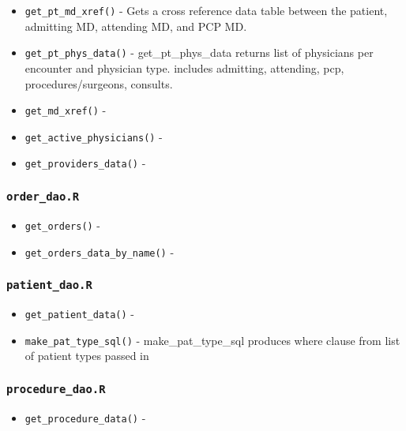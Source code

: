 \documentclass[
]{book}
\providecommand{\tightlist}{%
  \setlength{\itemsep}{0pt}\setlength{\parskip}{0pt}}
\begin{document}
\begin{itemize}
\tightlist
\item
  \texttt{get\_pt\_md\_xref()} - Gets a cross reference data table between the patient, admitting MD, attending MD, and PCP MD.
\item
  \texttt{get\_pt\_phys\_data()} - get\_pt\_phys\_data returns list of physicians per encounter and physician type. includes admitting, attending, pcp, procedures/surgeons, consults.
\item
  \texttt{get\_md\_xref()} -
\item
  \texttt{get\_active\_physicians()} -
\item
  \texttt{get\_providers\_data()} -
\end{itemize}

\hypertarget{order_dao.r}{%
\subsubsection{\texorpdfstring{\texttt{order\_dao.R}}{order\_dao.R}}\label{order_dao.r}}

\begin{itemize}
\tightlist
\item
  \texttt{get\_orders()} -
\item
  \texttt{get\_orders\_data\_by\_name()} -
\end{itemize}

\hypertarget{patient_dao.r}{%
\subsubsection{\texorpdfstring{\texttt{patient\_dao.R}}{patient\_dao.R}}\label{patient_dao.r}}

\begin{itemize}
\tightlist
\item
  \texttt{get\_patient\_data()} -
\item
  \texttt{make\_pat\_type\_sql()} - make\_pat\_type\_sql produces where clause from list of patient types passed in
\end{itemize}

\hypertarget{procedure_dao.r}{%
\subsubsection{\texorpdfstring{\texttt{procedure\_dao.R}}{procedure\_dao.R}}\label{procedure_dao.r}}

\begin{itemize}
\tightlist
\item
  \texttt{get\_procedure\_data()} -
\end{itemize}
\end{document}
